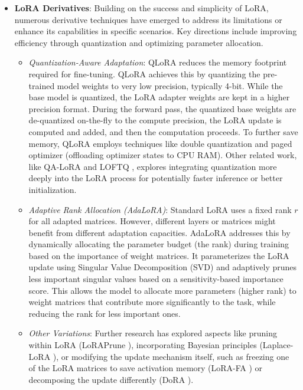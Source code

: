 \begin{itemize}
    \item \textbf{LoRA Derivatives}: Building on the success and simplicity of LoRA, numerous derivative techniques have emerged to address its limitations or enhance its capabilities in specific scenarios. Key directions include improving efficiency through quantization and optimizing parameter allocation.
            \begin{itemize}
                \item \textit{Quantization-Aware Adaptation}: QLoRA \cite{dettmers2023qlora} reduces the memory footprint required for fine-tuning. QLoRA achieves this by quantizing the pre-trained model weights to very low precision, typically 4-bit. While the base model is quantized, the LoRA adapter weights are kept in a higher precision format. During the forward pass, the quantized base weights are de-quantized on-the-fly to the compute precision, the LoRA update is computed and added, and then the computation proceeds. To further save memory, QLoRA employs techniques like double quantization and paged optimizer (offloading optimizer states to CPU RAM). Other related work, like QA-LoRA \cite{xu2023qalora} and LOFTQ \cite{li2023loftq}, explores integrating quantization more deeply into the LoRA process for potentially faster inference or better initialization.
    
                \item \textit{Adaptive Rank Allocation (AdaLoRA)}: Standard LoRA uses a fixed rank \(r\) for all adapted matrices. However, different layers or matrices might benefit from different adaptation capacities. AdaLoRA \cite{zhang2023adalora} addresses this by dynamically allocating the parameter budget (the rank) during training based on the importance of weight matrices. It parameterizes the LoRA update using Singular Value Decomposition (SVD) and adaptively prunes less important singular values based on a sensitivity-based importance score. This allows the model to allocate more parameters (higher rank) to weight matrices that contribute more significantly to the task, while reducing the rank for less important ones.
    
                \item \textit{Other Variations}: Further research has explored aspects like pruning within LoRA (LoRAPrune \cite{Zhang_2024}), incorporating Bayesian principles (Laplace-LoRA \cite{yang2023bayesian}), or modifying the update mechanism itself, such as freezing one of the LoRA matrices to save activation memory (LoRA-FA \cite{zhang2023lorafa}) or decomposing the update differently (DoRA \cite{liu2024dora}).
            \end{itemize}
    \end{itemize}

